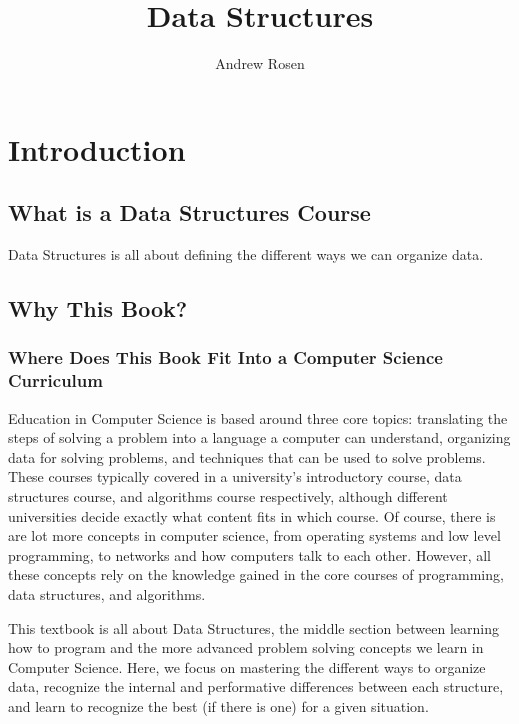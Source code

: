 \documentclass[10pt,a4paper]{book}
\begin{document}
\title{Data Structures}
\author{Andrew Rosen}
\date{}
\maketitle
\tableofcontents




\chapter{Introduction}

\section{What is a Data Structures Course}
Data Structures is all about defining the different ways we can organize data.


\section{Why This Book?}

\subsection{Where Does This Book Fit Into a Computer Science Curriculum }

Education in Computer Science is based around three core topics: translating the steps of solving a problem into a language a computer can understand, organizing data for solving problems, and techniques that can be used to solve problems. %
These courses typically covered in a university's introductory course, data structures course, and algorithms course respectively, although different universities decide exactly what content fits in which course.
Of course, there is are lot more concepts in computer science, from operating systems and low level programming,  to networks and how computers talk to each other. However, all these concepts rely on the knowledge gained in the core courses of programming, data structures, and algorithms.

 

This textbook is all about Data Structures, the middle section between learning how to program and the more advanced problem solving concepts we learn in Computer Science. 
Here, we focus on mastering the different ways to organize data, recognize the internal and performative differences between each structure, and learn to recognize the best (if there is one) for a given situation.
\end{document}
